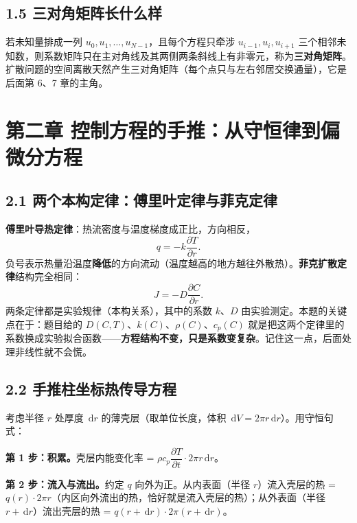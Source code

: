 \documentclass[12pt,a4paper]{ctexart}
\newcommand{\dd}{\,\mathrm{d}}
\newcommand{\pdd}[2]{\dfrac{\partial #1}{\partial #2}}
\begin{document}
\subsection{1.5 三对角矩阵长什么样}

若未知量排成一列 $u_0,u_1,\dots,u_{N-1}$，且每个方程只牵涉 $u_{i-1},u_i,u_{i+1}$ 三个相邻未知数，则系数矩阵只在主对角线及其两侧两条斜线上有非零元，称为\textbf{三对角矩阵}。扩散问题的空间离散天然产生三对角矩阵（每个点只与左右邻居交换通量），它是后面第 6、7 章的主角。

\section{第二章 控制方程的手推：从守恒律到偏微分方程}

\subsection{2.1 两个本构定律：傅里叶定律与菲克定律}

\textbf{傅里叶导热定律}：热流密度与温度梯度成正比，方向相反，
\begin{equation}
q=-k\pdd{T}{r}.
\end{equation}
负号表示热量沿温度\textbf{降低}的方向流动（温度越高的地方越往外散热）。\textbf{菲克扩散定律}结构完全相同：
\begin{equation}
J=-D\pdd{C}{r}.
\end{equation}
两条定律都是实验规律（本构关系），其中的系数 $k$、$D$ 由实验测定。本题的关键点在于：题目给的 $D(C,T)$、$k(C)$、$\rho(C)$、$c_p(C)$ 就是把这两个定律里的系数换成实验拟合函数——\textbf{方程结构不变，只是系数变复杂}。记住这一点，后面处理非线性就不会慌。

\subsection{2.2 手推柱坐标热传导方程}

考虑半径 $r$ 处厚度 $\dd r$ 的薄壳层（取单位长度，体积 $\dd V=2\pi r\dd r$）。用守恒句式：

\textbf{第 1 步：积累。}壳层内能变化率 = $\rho c_p\pdd{T}{t}\cdot 2\pi r\dd r$。

\textbf{第 2 步：流入与流出。}约定 $q$ 向外为正。从内表面（半径 $r$）流入壳层的热 = $q(r)\cdot 2\pi r$（内区向外流出的热，恰好就是流入壳层的热）；从外表面（半径 $r+\dd r$）流出壳层的热 = $q(r+\dd r)\cdot 2\pi(r+\dd r)$。
\end{document}
